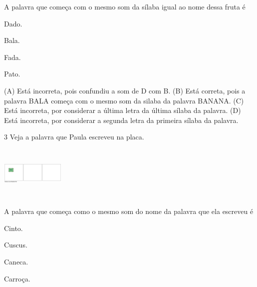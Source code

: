 
A palavra que começa com o mesmo som da sílaba igual ao nome dessa fruta é

\begin{minipage}{.5\textwidth}
\begin{escolha}
\item Dado.

\item Bala.

\item Fada.

\item Pato.
\end{escolha}
\end{minipage}

(A) Está incorreta, pois confundiu a som de D com B.
(B) Está correta, pois a palavra BALA começa com o mesmo som da silaba da palavra BANANA.
(C) Está incorreta, por considerar a última letra da última sílaba da palavra.
(D) Está incorreta, por considerar a segunda letra da primeira sílaba da palavra.

\num{3} Veja a palavra que Paula escreveu na placa.

\includegraphics[width=1.19861in,height=1.00625in]{media/image176.png}


A palavra que começa como o mesmo som do nome da palavra que ela escreveu é

\begin{minipage}{.5\textwidth}
\begin{escolha}
\item Cinto.

\item Cuscus.

\item Caneca.

\item Carroça.
\end{escolha}
\end{minipage}

